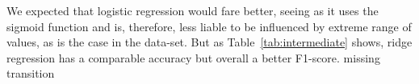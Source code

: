 \documentclass[10pt,conference,compsocconf]{IEEEtran}
\begin{document}
\begin{comment}
\begin{table}[ht]
\centering
\resizebox{\columnwidth}{!}{%
\begin{tabular}{lrrr|r|r|r|}
\cline{5-7}
 &
  \multicolumn{1}{c}{} &
  \multicolumn{1}{l}{} &
  \multicolumn{1}{l|}{} &
  \multicolumn{1}{l|}{Training} &
  \multicolumn{1}{l|}{Validation} &
  \multicolumn{1}{l|}{Testing} \\ \cline{2-7} 
\multicolumn{1}{l|}{} &
  \multicolumn{3}{c|}{Parameters} &
  \multicolumn{1}{l|}{F1-score} &
  \multicolumn{1}{l|}{F1-score} &
  \multicolumn{1}{l|}{F1-score} \\ \hline
\multicolumn{1}{|l|}{Methods} &
  \multicolumn{1}{l|}{Gamma} &
  \multicolumn{1}{l|}{Lambda} &
  \multicolumn{1}{l|}{Max\_iters} &
  \multicolumn{1}{l|}{Accuracy} &
  \multicolumn{1}{l|}{Accuracy} &
  \multicolumn{1}{l|}{Accuracy} \\ \hline
\multicolumn{1}{|l|}{\multirow{2}{*}{\begin{tabular}[c]{@{}l@{}}Logistic \\ regression\end{tabular}}} &
  \multicolumn{1}{r|}{0.5} &
  \multicolumn{1}{r|}{-} &
  10000 &
  71.20\% &
  71.43\% &
  71.20\% \\
\multicolumn{1}{|l|}{} &
  \multicolumn{1}{r|}{} &
  \multicolumn{1}{r|}{} &
   &
  80.10\% &
  81.66\% &
  80.80\% \\ \hline
\multicolumn{1}{|l|}{\multirow{2}{*}{Ridge Regression}} &
  \multicolumn{1}{r|}{-} &
  \multicolumn{1}{r|}{1e-4} &
  - &
  72.97\% &
  72.70\% &
  73.40\% \\
\multicolumn{1}{|l|}{} &
  \multicolumn{1}{r|}{} &
  \multicolumn{1}{r|}{} &
   &
  82.22\% &
  82.00\% &
  80.30\% \\ \hline
\end{tabular}%
}
\caption{Parameters, F1-score and accuracy results after preprocessing the data.}
\label{tab:intermediate}
\end{table}
\end{comment}

We expected that logistic regression would fare better, seeing as it uses 
the sigmoid function and is, therefore, less liable to be influenced by extreme 
range of values, as is the case in the data-set. 
But as Table~\ref{tab:intermediate} shows, ridge regression has a comparable
accuracy but overall a better F1-score.
missing transition
\end{document}

